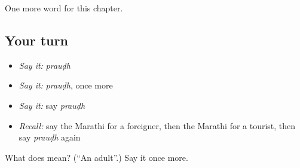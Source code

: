 \begin{grammarlens}[title={What you've built}]
One more word for this chapter.
\end{grammarlens}

\subsection*{Your turn}
\begin{itemize}
\raggedright
  \item \emph{Say it:} \emph{prauḍh}
  \item \emph{Say it:} \emph{prauḍh}, once more
  \item \emph{Say it:} say \emph{prauḍh}
  \item \emph{Recall:} say the Marathi for a foreigner, then the Marathi for a tourist, then say \emph{prauḍh} again
\end{itemize}

\begin{tcolorbox}[breakable,colback=teal!4,colframe=teal!35!black,title={Before you move on}]
What does  mean? (\textquotedblleft{}An adult\textquotedblright{}.) Say it once more.
\end{tcolorbox}
